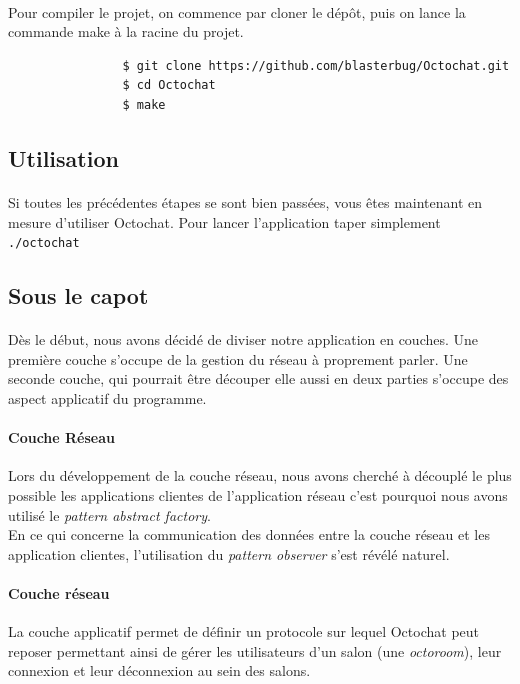 \documentclass[a4paper]{article}
\begin{document}
			\paragraph{}{
				Pour compiler le projet, on commence par cloner le dépôt, puis on lance la commande make à la racine du projet.
			}

			\begin{verbatim}
				$ git clone https://github.com/blasterbug/Octochat.git
				$ cd Octochat
				$ make
			\end{verbatim}

		\subsection{Utilisation}
			\paragraph{}{
			Si toutes les précédentes étapes se sont bien passées, vous êtes maintenant en mesure d'utiliser Octochat.
			Pour lancer l'application taper simplement \verb|./octochat|
			}

		\subsection{Sous le capot}
			\paragraph{}{
			Dès le début, nous avons décidé de diviser notre application en couches.
			Une première couche s'occupe de la gestion du réseau à proprement parler. Une seconde couche,
			qui pourrait être découper elle aussi en deux parties s'occupe des aspect applicatif du programme.
			}

			\paragraph{Couche Réseau}{
			Lors du développement de la couche réseau, nous avons cherché à découplé le plus possible les
			applications clientes de l’application réseau c’est pourquoi nous avons utilisé le \textit{pattern
			abstract factory}. \\
			En ce qui concerne la communication des données entre la couche réseau et les application clientes,
			l’utilisation du \textit{pattern observer} s’est révélé naturel.
			}

			\paragraph{Couche réseau}{
			La couche applicatif permet de définir un protocole sur lequel Octochat peut reposer permettant ainsi
			de gérer les utilisateurs d'un salon (une \textit{octoroom}), leur connexion et leur déconnexion au sein
			des salons.
			}
			
\end{document}
